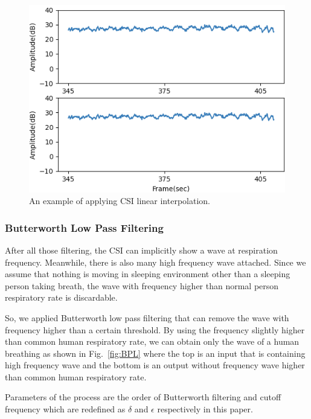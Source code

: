 \documentclass[10pt,letterpaper]{article}
\begin{document}
	\begin{figure}[htbp]
		\centerline{\includegraphics[width=120mm,scale=0.9]{FILPD_G2L.png}}
		\caption{An example of applying CSI linear interpolation.}
		\label{fig:LINEARINTER}
	\end{figure}
	
	

		\subsubsection*{Butterworth Low Pass Filtering}
			
			 After all those filtering, the CSI can implicitly show a wave at respiration frequency. Meanwhile, there is also many high frequency wave attached. Since we assume that nothing is moving in sleeping environment other than a sleeping person taking breath, the wave with frequency higher than normal person respiratory rate is discardable.
			 
			 So, we applied Butterworth low pass filtering that can remove the wave with frequency higher than a certain threshold. By using the  frequency slightly higher than common human respiratory rate, we can obtain only the wave of a human breathing as shown in Fig.~\ref{fig:BPL} where the top is an input that is containing high frequency wave and the bottom is an output without frequency wave higher than common human respiratory rate.
			 
			 Parameters of the process are the order of Butterworth filtering and cutoff frequency which are redefined as $\delta$ and $\epsilon$ respectively in this paper.
			
			
			
\end{document}
